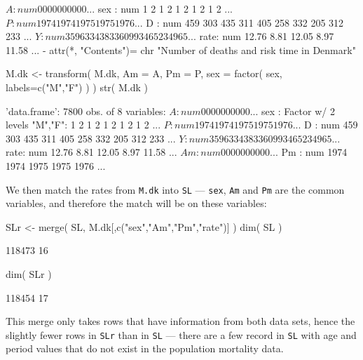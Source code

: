 \begin{enumerate}[resume]
\begin{Schunk}
\begin{Soutput}
 $ A   : num  0 0 0 0 0 0 0 0 0 0 ...
 $ sex : num  1 2 1 2 1 2 1 2 1 2 ...
 $ P   : num  1974 1974 1975 1975 1976 ...
 $ D   : num  459 303 435 311 405 258 332 205 312 233 ...
 $ Y   : num  35963 34383 36099 34652 34965 ...
 $ rate: num  12.76 8.81 12.05 8.97 11.58 ...
 - attr(*, "Contents")= chr "Number of deaths and risk time in Denmark"
\end{Soutput}
\begin{Sinput}
 M.dk <- transform( M.dk, Am = A,
                          Pm = P,
                         sex = factor( sex, labels=c("M","F") ) )
 str( M.dk )
\end{Sinput}
\begin{Soutput}
'data.frame':	7800 obs. of  8 variables:
 $ A   : num  0 0 0 0 0 0 0 0 0 0 ...
 $ sex : Factor w/ 2 levels "M","F": 1 2 1 2 1 2 1 2 1 2 ...
 $ P   : num  1974 1974 1975 1975 1976 ...
 $ D   : num  459 303 435 311 405 258 332 205 312 233 ...
 $ Y   : num  35963 34383 36099 34652 34965 ...
 $ rate: num  12.76 8.81 12.05 8.97 11.58 ...
 $ Am  : num  0 0 0 0 0 0 0 0 0 0 ...
 $ Pm  : num  1974 1974 1975 1975 1976 ...
\end{Soutput}
\end{Schunk}
We then match the rates from \texttt{M.dk} into \texttt{SL} ---
\texttt{sex}, \texttt{Am} and \texttt{Pm} are the common variables,
and therefore the match will be on these variables:
\begin{Schunk}
\begin{Sinput}
 SLr <- merge( SL, M.dk[,c("sex","Am","Pm","rate")] )
 dim( SL )
\end{Sinput}
\begin{Soutput}
[1] 118473     16
\end{Soutput}
\begin{Sinput}
 dim( SLr )
\end{Sinput}
\begin{Soutput}
[1] 118454     17
\end{Soutput}
\end{Schunk}
This merge only takes rows that have information from both data sets,
hence the slightly fewer rows in \texttt{SLr} than in \texttt{SL} ---
there are a few record in \texttt{SL} with age and period values that
do not exist in the population mortality data.
    

\end{enumerate}
